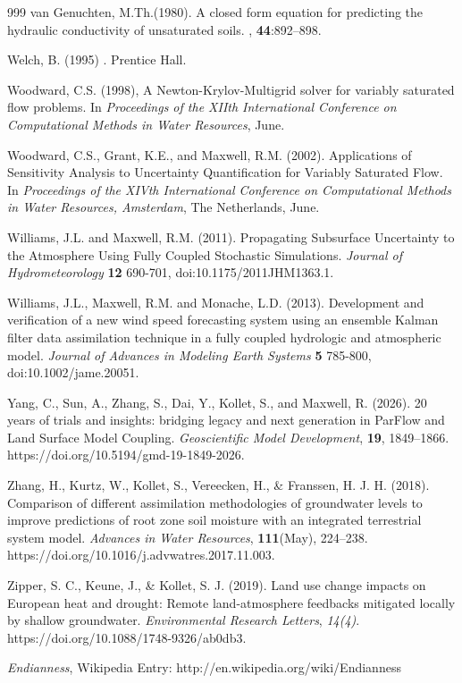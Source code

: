 \begin{thebibliography}{999}
{van Genuchten}, M.Th.(1980). 
\newblock A closed form equation for predicting the hydraulic conductivity of
  unsaturated soils.
, {\bf 44}:892--898.

Welch, B. (1995)
.
\newblock Prentice Hall.

Woodward, C.S. (1998),
\newblock A {N}ewton-{K}rylov-{M}ultigrid solver for variably saturated flow
  problems.
\newblock In {\em Proceedings of the XIIth International Conference on
  Computational Methods in Water Resources}, June.

Woodward, C.S., Grant,  K.E., and Maxwell, R.M. (2002). Applications of Sensitivity Analysis to Uncertainty Quantification for Variably Saturated Flow.
\newblock In {\em Proceedings of the XIVth International Conference on Computational Methods in Water Resources, Amsterdam}, The Netherlands, June.

Williams, J.L. and Maxwell, R.M. (2011). Propagating Subsurface Uncertainty to the Atmosphere Using Fully Coupled Stochastic Simulations. {\em Journal of Hydrometeorology} {\bf 12} 690-701, doi:10.1175/2011JHM1363.1.

Williams, J.L., Maxwell, R.M. and Monache, L.D. (2013). Development and verification of a new wind speed forecasting system using an ensemble Kalman filter data assimilation technique in a fully coupled hydrologic and atmospheric model. {\em Journal of Advances in Modeling Earth Systems} {\bf 5} 785-800, doi:10.1002/jame.20051.

Yang, C., Sun, A., Zhang, S., Dai, Y., Kollet, S., and Maxwell, R. (2026). 20 years of trials and insights: bridging legacy and next generation in ParFlow and Land Surface Model Coupling. {\em Geoscientific Model Development}, {\bf 19}, 1849--1866. https://doi.org/10.5194/gmd-19-1849-2026.

Zhang, H., Kurtz, W., Kollet, S., Vereecken, H., \& Franssen, H. J. H. (2018). Comparison of different assimilation methodologies of groundwater levels to improve predictions of root zone soil moisture with an integrated terrestrial system model. {\em Advances in Water Resources}, {\bf 111}(May), 224–238. https://doi.org/10.1016/j.advwatres.2017.11.003.


Zipper, S. C., Keune, J., \& Kollet, S. J. (2019). Land use change impacts on European heat and drought: Remote land-atmosphere feedbacks mitigated locally by shallow groundwater. {\em Environmental Research Letters}, {\em 14(4)}. https://doi.org/10.1088/1748-9326/ab0db3.

{\em Endianness}, Wikipedia Entry: http://en.wikipedia.org/wiki/Endianness



\end{thebibliography}

